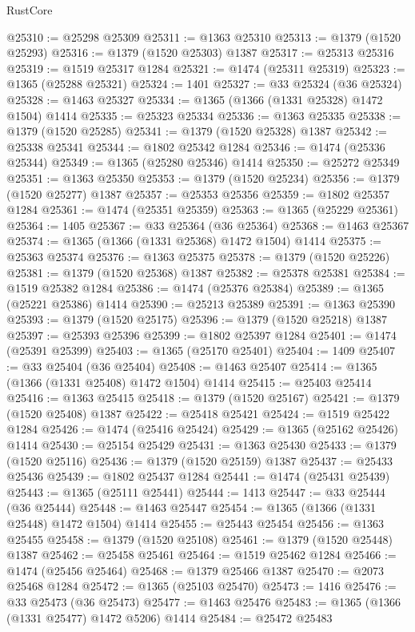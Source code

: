 \begin{lexlean}{RustCore}
\begin{coremodule}
@25310 := @25298 @25309
@25311 := @1363 @25310
@25313 := @1379 (@1520 @25293)
@25316 := @1379 (@1520 @25303) @1387
@25317 := @25313 @25316
@25319 := @1519 @25317 @1284
@25321 := @1474 (@25311 @25319)
@25323 := @1365 (@25288 @25321)
@25324 := 1401
@25327 := @33 @25324 (@36 @25324)
@25328 := @1463 @25327
@25334 := @1365 (@1366 (@1331 @25328) @1472 @1504) @1414
@25335 := @25323 @25334
@25336 := @1363 @25335
@25338 := @1379 (@1520 @25285)
@25341 := @1379 (@1520 @25328) @1387
@25342 := @25338 @25341
@25344 := @1802 @25342 @1284
@25346 := @1474 (@25336 @25344)
@25349 := @1365 (@25280 @25346) @1414
@25350 := @25272 @25349
@25351 := @1363 @25350
@25353 := @1379 (@1520 @25234)
@25356 := @1379 (@1520 @25277) @1387
@25357 := @25353 @25356
@25359 := @1802 @25357 @1284
@25361 := @1474 (@25351 @25359)
@25363 := @1365 (@25229 @25361)
@25364 := 1405
@25367 := @33 @25364 (@36 @25364)
@25368 := @1463 @25367
@25374 := @1365 (@1366 (@1331 @25368) @1472 @1504) @1414
@25375 := @25363 @25374
@25376 := @1363 @25375
@25378 := @1379 (@1520 @25226)
@25381 := @1379 (@1520 @25368) @1387
@25382 := @25378 @25381
@25384 := @1519 @25382 @1284
@25386 := @1474 (@25376 @25384)
@25389 := @1365 (@25221 @25386) @1414
@25390 := @25213 @25389
@25391 := @1363 @25390
@25393 := @1379 (@1520 @25175)
@25396 := @1379 (@1520 @25218) @1387
@25397 := @25393 @25396
@25399 := @1802 @25397 @1284
@25401 := @1474 (@25391 @25399)
@25403 := @1365 (@25170 @25401)
@25404 := 1409
@25407 := @33 @25404 (@36 @25404)
@25408 := @1463 @25407
@25414 := @1365 (@1366 (@1331 @25408) @1472 @1504) @1414
@25415 := @25403 @25414
@25416 := @1363 @25415
@25418 := @1379 (@1520 @25167)
@25421 := @1379 (@1520 @25408) @1387
@25422 := @25418 @25421
@25424 := @1519 @25422 @1284
@25426 := @1474 (@25416 @25424)
@25429 := @1365 (@25162 @25426) @1414
@25430 := @25154 @25429
@25431 := @1363 @25430
@25433 := @1379 (@1520 @25116)
@25436 := @1379 (@1520 @25159) @1387
@25437 := @25433 @25436
@25439 := @1802 @25437 @1284
@25441 := @1474 (@25431 @25439)
@25443 := @1365 (@25111 @25441)
@25444 := 1413
@25447 := @33 @25444 (@36 @25444)
@25448 := @1463 @25447
@25454 := @1365 (@1366 (@1331 @25448) @1472 @1504) @1414
@25455 := @25443 @25454
@25456 := @1363 @25455
@25458 := @1379 (@1520 @25108)
@25461 := @1379 (@1520 @25448) @1387
@25462 := @25458 @25461
@25464 := @1519 @25462 @1284
@25466 := @1474 (@25456 @25464)
@25468 := @1379 @25466 @1387
@25470 := @2073 @25468 @1284
@25472 := @1365 (@25103 @25470)
@25473 := 1416
@25476 := @33 @25473 (@36 @25473)
@25477 := @1463 @25476
@25483 := @1365 (@1366 (@1331 @25477) @1472 @5206) @1414
@25484 := @25472 @25483

\end{coremodule}
\end{lexlean}
